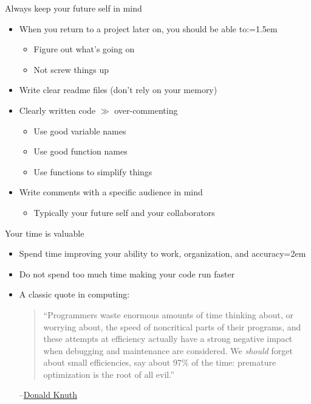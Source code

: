 \documentclass{beamer}
\begin{document}
\begin{frame}{Always keep your future self in mind}
    \begin{itemize}
        \item When you return to a project later on, you should be able to:\itemsep=1.5em
        \begin{itemize}
            \item Figure out what's going on
            \item Not screw things up
        \end{itemize}
        \item Write clear readme files (don't rely on your memory)
        \item Clearly written code $\gg$ over-commenting
        \begin{itemize}
            \item Use good variable names
            \item Use good function names
            \item Use functions to simplify things
        \end{itemize}
        \item Write comments with a specific audience in mind
        \begin{itemize}
            \item Typically your future self and your collaborators
        \end{itemize}
    \end{itemize}
\end{frame}

\begin{frame}{Your time is valuable}
    \begin{itemize}
        \item Spend time improving your ability to work, organization, and accuracy\itemsep=2em
        \item Do not spend too much time making your code run faster
        \item<2> A classic quote in computing: \begin{quote}
    ``Programmers waste enormous amounts of time thinking about, or worrying about, the speed of noncritical parts of their programs, and these attempts at efficiency actually have a  strong negative impact when debugging and maintenance are considered. We \textit{should} forget about small efficiencies, say about 97\% of the time: premature optimization is the root of all evil.''
    \end{quote}
    --\href{https://doi.org/10.1145/356635.356640}{Donald Knuth}
    \end{itemize}
\end{frame}
\end{document}
